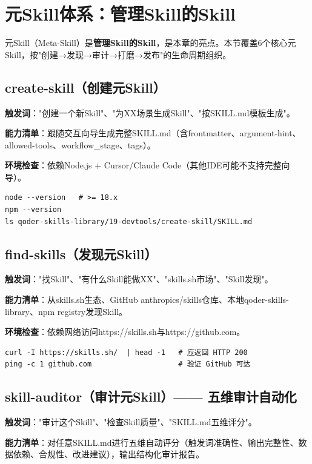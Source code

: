 \section{元Skill体系：管理Skill的Skill}


元Skill（Meta-Skill）是\textbf{管理Skill的Skill}，是本章的亮点。本节覆盖6个核心元Skill，按"创建→发现→审计→打磨→发布"的生命周期组织。

\subsection{create-skill（创建元Skill）}
\textbf{触发词}："创建一个新Skill"、"为XX场景生成Skill"、"按SKILL.md模板生成"。

\textbf{能力清单}：跟随交互向导生成完整SKILL.md（含frontmatter、argument-hint、allowed-tools、workflow\_stage、tags）。

\textbf{环境检查}：依赖Node.js + Cursor/Claude Code（其他IDE可能不支持完整向导）。
\begin{lstlisting}[style=shell]
node --version   # >= 18.x
npm --version
ls qoder-skills-library/19-devtools/create-skill/SKILL.md
\end{lstlisting}

\subsection{find-skills（发现元Skill）}
\textbf{触发词}："找Skill"、"有什么Skill能做XX"、"skills.sh市场"、"Skill发现"。

\textbf{能力清单}：从skills.sh生态、GitHub anthropics/skills仓库、本地qoder-skills-library、npm registry发现Skill。

\textbf{环境检查}：依赖网络访问https://skills.sh与https://github.com。
\begin{lstlisting}[style=shell]
curl -I https://skills.sh/  | head -1   # 应返回 HTTP 200
ping -c 1 github.com                    # 验证 GitHub 可达
\end{lstlisting}

\subsection{skill-auditor（审计元Skill）—— 五维审计自动化}
\textbf{触发词}："审计这个Skill"、"检查Skill质量"、"SKILL.md五维评分"。

\textbf{能力清单}：对任意SKILL.md进行五维自动评分（触发词准确性、输出完整性、数据依赖、合规性、改进建议），输出结构化审计报告。

